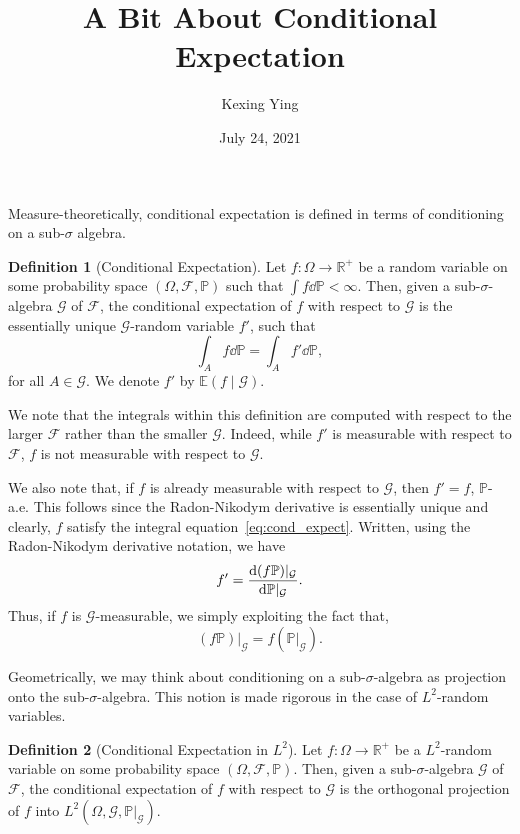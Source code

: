 \documentclass[]{article}
\title{A Bit About Conditional Expectation}
\author{Kexing Ying}
\date{July 24, 2021}
\theoremstyle{definition}
\newtheorem{definition*}{Definition}
\theoremstyle{definition}
\begin{document}
\maketitle

Measure-theoretically, conditional expectation is defined in terms of conditioning 
on a sub-\(\sigma\) algebra. 

\begin{definition*}[Conditional Expectation]
  Let \(f : \Omega \to \mathbb{R}^+\) be a random variable on some probability 
  space \((\Omega, \mathcal{F}, \mathbb{P})\) such that \(\int f \dd \mathbb{P} < \infty\). 
  Then, given a sub-\(\sigma\)-algebra \(\mathcal{G}\) of \(\mathcal{F}\), the 
  conditional expectation of \(f\) with respect to \(\mathcal{G}\) is the 
  essentially unique \(\mathcal{G}\)-random variable \(f'\), such that 
  \begin{equation}\label{eq:cond_expect}
    \int_A f \dd \mathbb{P} = \int_A f' \dd \mathbb{P},
  \end{equation}
  for all \(A \in \mathcal{G}\). We denote \(f'\) by \(\mathbb{E}(f \mid \mathcal{G})\).
\end{definition*}

We note that the integrals within this definition are computed with respect to 
the larger \(\mathcal{F}\) rather than the smaller \(\mathcal{G}\). Indeed, 
while \(f'\) is measurable with respect to \(\mathcal{F}\), \(f\) is not 
measurable with respect to \(\mathcal{G}\).

We also note that, if \(f\) is already measurable with respect to \(\mathcal{G}\), 
then \(f' = f\), \(\mathbb{P}\)-a.e. This follows since the Radon-Nikodym derivative 
is essentially unique and clearly, \(f\) satisfy the integral equation~\ref{eq:cond_expect}.
Written, using the Radon-Nikodym derivative notation, we have 
\[f' = \dv{(f \mathbb{P})|_\mathcal{G}}{\mathbb{P}|_\mathcal{G}}.\]
Thus, if \(f\) is \(\mathcal{G}\)-measurable, we simply exploiting the fact that,
\[(f \mathbb{P})|_\mathcal{G} = f (\mathbb{P}|_\mathcal{G}).\]

Geometrically, we may think about conditioning on a sub-\(\sigma\)-algebra as projection 
onto the sub-\(\sigma\)-algebra. This notion is made rigorous in the case of 
\(L^2\)-random variables. 

\begin{definition*}[Conditional Expectation in \(L^2\)]
  Let \(f : \Omega \to \mathbb{R}^+\) be a \(L^2\)-random variable on some probability 
  space \((\Omega, \mathcal{F}, \mathbb{P})\). Then, given a sub-\(\sigma\)-algebra 
  \(\mathcal{G}\) of \(\mathcal{F}\), the conditional expectation of 
  \(f\) with respect to \(\mathcal{G}\) is the orthogonal projection of \(f\) into 
  \(L^2(\Omega, \mathcal{G}, \mathbb{P}|_\mathcal{G})\).
\end{definition*}
\end{document}
